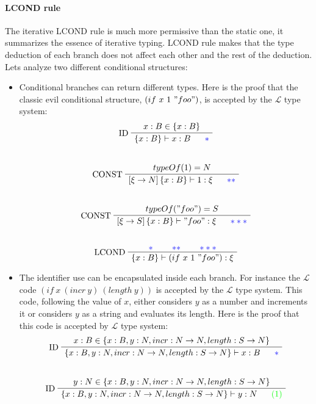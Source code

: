 \documentclass[a4paper]{report}
\newcommand{\lang}[0]{\mathcal{L}}
\newcommand{\gmarker}[1]{\textcolor{green}{~~~~~#1}}
\newcommand{\bmarker}[1]{\textcolor{blue}{~~~~~#1}}
\newcommand{\ax}[1]%
{\AxiomC{$#1$}}
\newcommand{\unc}[1]%
{\UnaryInfC{$#1$}}
\newcommand{\tric}[1]%
{\TrinaryInfC{$#1$}}
\newcommand{\drule}%
{\DisplayProof}
\begin{document}
\paragraph{LCOND rule} The iterative LCOND rule is much more permissive than the static one, it summarizes the essence of iterative typing. LCOND rule makes that the type deduction of each branch does not affect each other and the rest of the deduction. Lets analyze two different conditional structures:
\begin{itemize}
\item Conditional branches can return different types. Here is the proof that the classic evil conditional structure, $(if\ x\ 1\ "foo")$, is accepted by the $\lang$ type system:
$$\begin{array}{c}
\ax{x:B\in\{x:B\}}
\LeftLabel{ID}
\unc{\{x:B\}\vdash x:B\bmarker{*}}
\drule
\\\\\\
\ax{typeOf(1)=N}
\LeftLabel{CONST}
\unc{\left[\xi\to N\right]\{x:B\}\vdash 1:\xi\bmarker{**}}
\drule
\\\\\\
\ax{typeOf("foo")=S}
\LeftLabel{CONST}
\unc{\left[\xi\to S\right]\{x:B\}\vdash "foo":\xi\bmarker{***}}
\drule
\\\\\\
\ax{\textcolor{blue}{*}}
\ax{\textcolor{blue}{**}}
\ax{\textcolor{blue}{***}}
\LeftLabel{LCOND}
\tric{\{x:B\}\vdash (if\ x\ 1\ "foo"):\xi}
\drule
\end{array}$$
\item The identifier use can be encapsulated inside each branch. For instance the $\lang$ code $(if\ x\ (incr\ y)\ (length\ y))$ is accepted by the $\lang$ type system. This code, following the value of $x$, either considers $y$ as a number and increments it or considers $y$ as a string and evaluates its length. Here is the proof that this code is accepted by $\lang$ type system:
$$\begin{array}{c}
\ax{x:B\in\{x:B, y:N, incr:N\to N, length:S\to N\}}
\LeftLabel{ID}
\unc{\{x:B, y:N, incr:N\to N, length:S\to N\}\vdash x:B\bmarker{*}}
\drule
\\\\\\
\ax{y:N\in\{x:B, y:N, incr:N\to N, length:S\to N\}}
\LeftLabel{ID}
\unc{\{x:B, y:N, incr:N\to N, length:S\to N\}\vdash y:N\gmarker{(1)}}
\drule
\\\\\\

\end{array}$$
\end{itemize}
\end{document}
